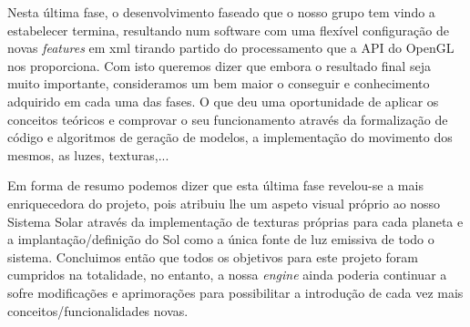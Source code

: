 \documentclass[11pt,a4paper]{report}
\begin{document}
Nesta última fase, o desenvolvimento faseado que o nosso grupo tem vindo a estabelecer termina, resultando num software com uma flexível configuração de novas \emph{features} em xml tirando partido do processamento que a API do OpenGL nos proporciona. Com isto queremos dizer que embora o resultado final seja muito importante, consideramos um bem maior o conseguir e conhecimento adquirido em cada uma das fases. O que deu uma oportunidade de aplicar os conceitos teóricos e comprovar o seu funcionamento através da formalização de código e algoritmos de geração de modelos, a implementação do movimento dos mesmos, as luzes, texturas,...

Em forma de resumo podemos dizer que esta última fase revelou-se a mais enriquecedora do projeto, pois atribuiu lhe um aspeto visual próprio ao nosso Sistema Solar através da implementação de texturas próprias para cada planeta e a implantação/definição do Sol como a única fonte de luz emissiva de todo o sistema. Concluimos então que todos os objetivos para este projeto foram cumpridos na totalidade, no entanto, a nossa \emph{engine} ainda poderia continuar a sofre modificações e aprimorações para possibilitar a introdução de cada vez mais conceitos/funcionalidades novas.
\end{document}
